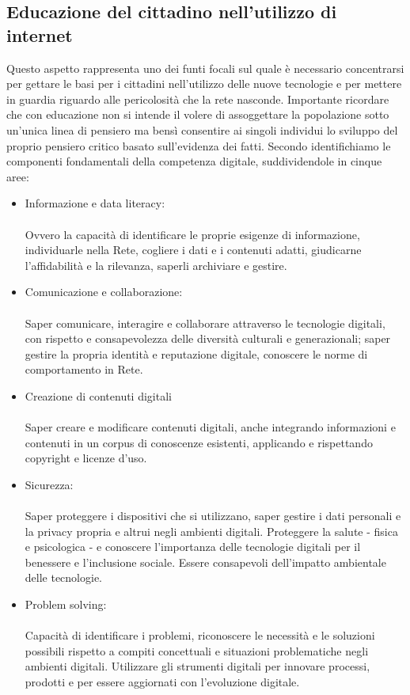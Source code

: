 \documentclass{article}
\begin{document}
\subsection{Educazione del cittadino nell'utilizzo di internet}
Questo aspetto rappresenta uno dei funti focali sul quale è necessario concentrarsi per gettare le basi per i cittadini nell'utilizzo delle nuove tecnologie e per mettere in guardia riguardo alle pericolosità che la rete nasconde.
Importante ricordare che con educazione non si intende il volere di assoggettare la popolazione sotto un'unica linea di pensiero ma bensì consentire ai singoli individui lo sviluppo del proprio pensiero critico basato sull'evidenza dei fatti.
Secondo \cite{digital-citizenship} identifichiamo le componenti fondamentali della competenza digitale, suddividendole in cinque aree:
\begin{itemize}
    \item Informazione e data literacy: \\
    \\
    Ovvero la capacità di identificare le proprie esigenze di informazione, individuarle nella Rete, cogliere i dati e i contenuti adatti, giudicarne l’affidabilità e la rilevanza, saperli archiviare e gestire.
    \item Comunicazione e collaborazione: \\
    \\
    Saper comunicare, interagire e collaborare attraverso le tecnologie digitali, con rispetto e consapevolezza delle diversità culturali e generazionali; saper gestire la propria identità e reputazione digitale, conoscere le norme di comportamento in Rete.
    \item Creazione di contenuti digitali \\
    \\
    Saper creare e modificare contenuti digitali, anche integrando informazioni e contenuti in un corpus di conoscenze esistenti, applicando e rispettando copyright e licenze d’uso.
    \item Sicurezza: \\
    \\
    Saper proteggere i dispositivi che si utilizzano, saper gestire i dati personali e la privacy propria e altrui negli ambienti digitali. Proteggere la salute - fisica e psicologica - e conoscere l’importanza delle tecnologie digitali per il benessere e l’inclusione sociale. Essere consapevoli dell’impatto ambientale delle tecnologie.
    \item Problem solving: \\
    \\
    Capacità di identificare i problemi, riconoscere le necessità e le soluzioni possibili rispetto a compiti concettuali e situazioni problematiche negli ambienti digitali. Utilizzare gli strumenti digitali per innovare processi, prodotti e per essere aggiornati con l’evoluzione digitale.


\end{itemize}
\end{document}
